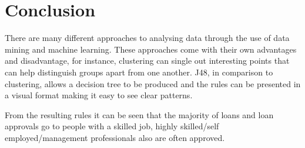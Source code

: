 \documentclass[12pt]{article}
\begin{document}
\section{Conclusion}
There are many different approaches to analysing data through the use of data mining and machine learning. These approaches come with their own advantages and disadvantage, for instance, clustering can single out interesting points that can help distinguish groups apart from one another. J48, in comparison to clustering, allows a decision tree to be produced and the rules can be presented in a visual format making it easy to see clear patterns. 

From the resulting rules it can be seen that the majority of loans and loan approvals go to people with a skilled job, highly skilled/self employed/management professionals also are often approved. 
\end{document}
